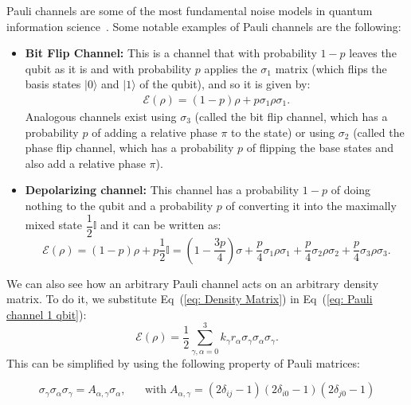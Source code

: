 \documentclass[10pt,letterpaper]{article} %
\newcommand{\eref}[1]{Eq~(\ref{#1})}
\begin{document}
Pauli channels are some of the 
most fundamental noise models in quantum information science~\cite{Terhal}. 
Some notable examples of Pauli channels are the following:
\begin{itemize}
\item \textbf{Bit Flip Channel:} This is a channel that with probability $1-p$ leaves the qubit as it is 
and with probability $p$ applies the $\sigma_1$ matrix 
(which flips the basis states $|0\rangle$ and $|1\rangle$ of the qubit), and
so it is given by:
\begin{align*}
\mathcal{E}(\rho) = (1-p) \rho + p \sigma_1 \rho \sigma_1.
\end{align*}
Analogous channels exist using $\sigma_3$ (called the bit flip channel,
which has a probability $p$ of adding a relative phase $\pi$ to the state) or 
using $\sigma_2$ (called the phase flip channel, 
which has a probability $p$ of 
flipping the base states and also add a relative phase $\pi$).
\item \textbf{Depolarizing channel:} 
This channel has a probability $1-p$
of doing nothing to the qubit and a probability $p$ of converting it into the maximally mixed state $\dfrac{1}{2} \mathbb{I}$
and it can be written as:
\begin{equation}
\mathcal{E}(\rho) = (1-p)\rho + p \dfrac{1}{2} \mathbb{I} = \left(1 - \dfrac{3p}{4} \right) \sigma + \dfrac{p}{4} \sigma_1 \rho \sigma_1 + \dfrac{p}{4} \sigma_2 \rho \sigma_2+ \dfrac{p}{4} \sigma_3 \rho \sigma_3.
\end{equation} 
\end{itemize}

We can also see how an arbitrary Pauli channel acts on an arbitrary  
density matrix.
To do it, we substitute \eref{eq: Density Matrix} 
in \eref{eq: Pauli channel 1 qbit}:
\begin{equation}
\mathcal{E}(\rho) = \dfrac{1}{2}\sum_{\gamma,\alpha=0}^3 k_{\gamma} r_{\alpha} \sigma_{\gamma} \sigma_{\alpha} \sigma_{\gamma}.
\end{equation}
This can be simplified by using the following property of Pauli matrices:


{\color{green}
\begin{equation*}
\sigma_{\gamma} \sigma_{\alpha} \sigma_{\gamma}  =   A_{\alpha,\gamma} \sigma_{\alpha}, \;\;\;\;\;\; \text{with} \; A_{\alpha, \gamma} = (2\delta_{ij}-1)(2\delta_{i0}-1)(2\delta_{j0}-1)
\end{equation*}
}
\end{document}
